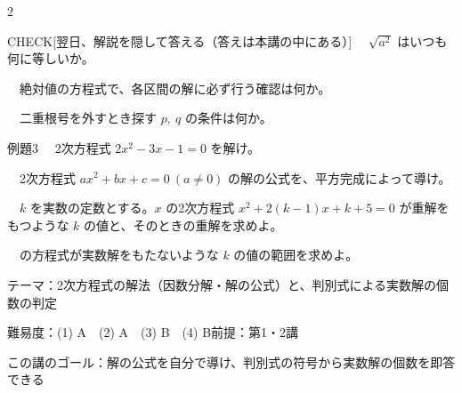 \documentclass[paper=b5j, fontsize=8pt, fleqn, twoside]{jlreq}
\begin{document}
\begin{multicols*}{2}
  \begin{ptbs}{CHECK}[翌日、解説を隠して答える（答えは本講の中にある）]
    　$\sqrt{a^2}$ はいつも何に等しいか。\par
    　絶対値の方程式で、各区間の解に必ず行う確認は何か。\par
    　二重根号を外すとき探す $p,\ q$ の条件は何か。
  \end{ptbs}

  \notefill
\end{multicols*}

\begin{ascolorbox4A}[出典：オリジナル]{例題3}
  　2次方程式 $2x^2-3x-1=0$ を解け。\par
  　2次方程式 $ax^2+bx+c=0\ (a\neq0)$ の解の公式を、平方完成によって導け。\par
  　$k$ を実数の定数とする。$x$ の2次方程式 $x^2+2(k-1)x+k+5=0$ が重解をもつような $k$ の値と、そのときの重解を求めよ。\par
  　の方程式が実数解をもたないような $k$ の値の範囲を求めよ。
\end{ascolorbox4A}

\begin{Data}
  テーマ：2次方程式の解法（因数分解・解の公式）と、判別式による実数解の個数の判定\par
  難易度：(1) A　(2) A　(3) B　(4) B\quad 前提：第1・2講\par
  この講のゴール：解の公式を自分で導け、判別式の符号から実数解の個数を即答できる
\end{Data}
\end{document}
